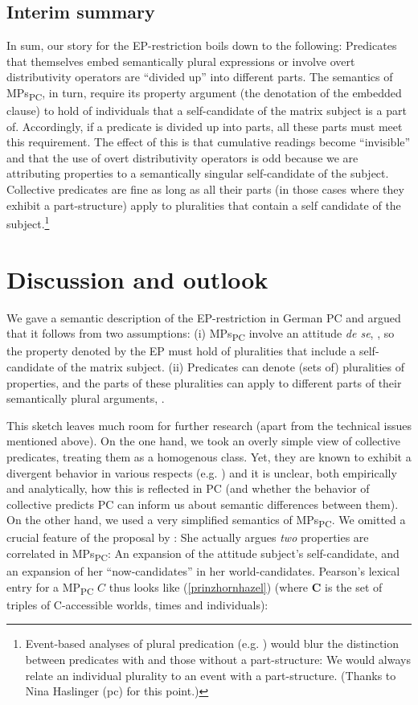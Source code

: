 \documentclass[output=paper,colorlinks,citecolor=brown,
]{langscibook}
\begin{document}
\subsection{Interim summary}

In sum, our story for the EP-restriction boils down to the following: Predicates that themselves embed semantically plural expressions or involve overt distributivity operators are “divided up” into different parts. The semantics of MPs\textsubscript{PC}, in turn, require its property argument (the denotation of the embedded clause) to hold of individuals that a self-candidate of the matrix subject is a part of. Accordingly, if a predicate is divided up into parts, all these parts must meet this requirement. The effect of this is that cumulative readings become “invisible” and that the use of overt distributivity operators is odd because we are attributing properties to a semantically singular self-candidate of the subject. Collective predicates are fine as long as all their parts (in those cases where they exhibit a part-structure) apply to pluralities that contain a self candidate of the subject.\footnote{Event-based analyses of plural predication (e.g. \citealt{Kratzer:2000}) would blur the distinction between predicates with and those without a part-structure: We would always relate an individual plurality to an event with a part-structure. (Thanks to Nina Haslinger (pc) for this point.)}

\section{Discussion and outlook}\label{prinzhornsec:5}

We gave a semantic description of the EP-restriction in German PC and argued that it follows from two assumptions: (i) MPs\textsubscript{PC} involve an attitude \textit{de se}, \citep{Pearson:2016}, so the property denoted by the EP must hold of pluralities that include a self-candidate of the matrix subject. (ii) Predicates can denote (sets of) pluralities of properties, and the parts of these pluralities can apply to different parts of their semantically plural arguments, \citep{Haslinger:2018a,Haslinger:2018b}.

This sketch leaves much room for further research (apart from the technical issues mentioned above). On the one hand, we took an overly simple view of collective predicates, treating them as a homogenous class. Yet, they are known to exhibit a divergent behavior in various respects (e.g. \citealt{Dowty:1986, Landman:2000}) and it is unclear, both empirically and analytically, how this is reflected in PC (and whether the behavior of collective predicts PC can inform us about  semantic differences between them).
On the other hand,  we used a very simplified semantics of MPs\textsubscript{PC}. We omitted a crucial feature of the proposal by \citet{Pearson:2016}: She actually 
 argues \textit{two} properties are correlated in  MPs\textsubscript{PC}: An expansion of the attitude subject's self-candidate, and an expansion of her “now-candidates” in her world-candidates. Pearson's lexical entry for a MP\textsubscript{PC} $C$ thus looks like (\ref{prinzhornhazel}) (where \textbf{C} is the set of triples of C-accessible worlds, times and individuals):
\end{document}
